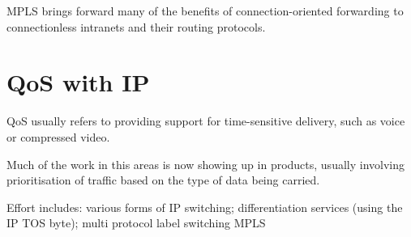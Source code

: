 MPLS brings forward many of the benefits of connection-oriented forwarding to connectionless intranets and their routing protocols. 

\section*{QoS with IP}
QoS usually refers to providing support for time-sensitive delivery, such as voice or compressed video.

Much of the work in this areas is now showing up in products, usually involving prioritisation of traffic based on the type of data being carried.

Effort includes: various forms of IP switching; differentiation services (using the IP TOS byte); multi protocol label switching MPLS